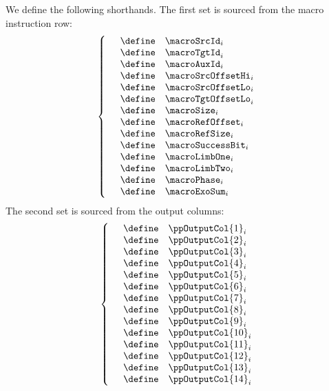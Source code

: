 \begin{center}
\end{center}
We define the following shorthands.
The first set is sourced from the macro instruction row:
\[
	\left\{ \begin{array}{lcl}
		& \define & \macroSrcId_{i} \\
		& \define & \macroTgtId_{i} \\
		& \define & \macroAuxId_{i} \\
		& \define & \macroSrcOffsetHi_{i} \\
		& \define & \macroSrcOffsetLo_{i} \\
		& \define & \macroTgtOffsetLo_{i} \\
		& \define & \macroSize_{i} \\
		& \define & \macroRefOffset_{i} \\
		& \define & \macroRefSize_{i} \\
		& \define & \macroSuccessBit_{i} \\
		& \define & \macroLimbOne_{i} \\
		& \define & \macroLimbTwo_{i} \\
		& \define & \macroPhase_{i} \\
		& \define & \macroExoSum_{i} \\
	\end{array} \right.
\]
The second set is sourced from the output columns:
\[
	\left\{ \begin{array}{lcl}
		& \define & \ppOutputCol{1}_{i} \\
		& \define & \ppOutputCol{2}_{i} \\
		& \define & \ppOutputCol{3}_{i} \\
		& \define & \ppOutputCol{4}_{i} \\
		& \define & \ppOutputCol{5}_{i} \\
		& \define & \ppOutputCol{6}_{i} \\
		& \define & \ppOutputCol{7}_{i} \\
		& \define & \ppOutputCol{8}_{i} \\
		& \define & \ppOutputCol{9}_{i} \\
		& \define & \ppOutputCol{10}_{i} \\
		& \define & \ppOutputCol{11}_{i} \\
		& \define & \ppOutputCol{12}_{i} \\
		& \define & \ppOutputCol{13}_{i} \\
		& \define & \ppOutputCol{14}_{i} \\
	\end{array} \right.
\]

